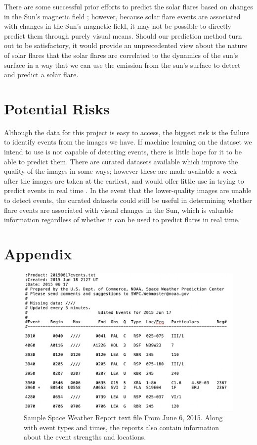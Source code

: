 \documentclass[12pt, letterpaper]{article}
\begin{document}
There are some successful prior efforts to predict the solar flares based on changes in the Sun’s magnetic field \cite{Raboonik2016}; however, because solar flare events are associated with changes in the Sun’s magnetic field, it may not be possible to directly predict them through purely visual means. Should our prediction method turn out to be satisfactory, it would provide an unprecedented view about the nature of solar flares that the solar flares are correlated to the dynamics of the sun's surface in a way that we can use the emission from the sun's surface to detect and predict a solar flare.


\section*{Potential Risks}

Although the data for this project is easy to access, the biggest risk is the failure to identify events from the images we have. If machine learning on the dataset we intend to use is not capable of detecting events, there is little hope for it to be able to predict them. There are curated datasets available which improve the quality of the images in some ways; however these are made available a week after the images are taken at the earliest, and would offer little use in trying to predict events in real time \cite{Galvez2019}. In the event that the lower-quality images are unable to detect events, the curated datasets could still be useful in determining whether flare events are associated with visual changes in the Sun, which is valuable information regardless of whether it can be used to predict flares in real time.




\pagebreak
\section*{Appendix}


\begin{figure}[h]
    \includegraphics[width=12cm]{figures/swr_sample.png}
    \centering
    \caption{Sample Space Weather Report text file From June 6, 2015. Along with event types and times, the reports also contain information about the event strengths and locations.}
    \label{swr_sample}
\end{figure}
\end{document}
